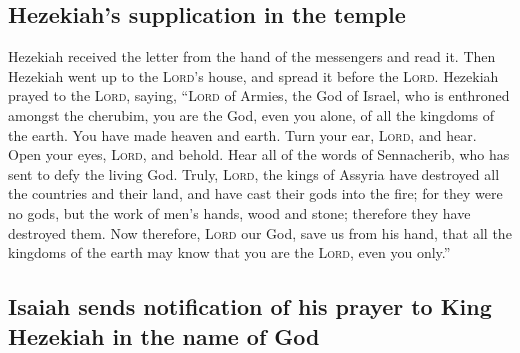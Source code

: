 \hypertarget{hezekiahs-supplication-in-the-temple}{%
\subsection{Hezekiah's supplication in the
temple}\label{hezekiahs-supplication-in-the-temple}}

 Hezekiah received the letter from the hand of the
messengers and read it. Then Hezekiah went up to the \textsc{Lord}'s
house, and spread it before the \textsc{Lord}.  Hezekiah
prayed to the \textsc{Lord}, saying,  ``\textsc{Lord} of
Armies, the God of Israel, who is enthroned amongst the cherubim, you
are the God, even you alone, of all the kingdoms of the earth. You have
made heaven and earth.  Turn your ear, \textsc{Lord}, and
hear. Open your eyes, \textsc{Lord}, and behold. Hear all of the words
of Sennacherib, who has sent to defy the living God. 
Truly, \textsc{Lord}, the kings of Assyria have destroyed all the
countries and their land,  and have cast their gods into
the fire; for they were no gods, but the work of men's hands, wood and
stone; therefore they have destroyed them.  Now
therefore, \textsc{Lord} our God, save us from his hand, that all the
kingdoms of the earth may know that you are the \textsc{Lord}, even you
only.''

\hypertarget{isaiah-sends-notification-of-his-prayer-to-king-hezekiah-in-the-name-of-god}{%
\subsection{Isaiah sends notification of his prayer to King Hezekiah in
the name of
God}\label{isaiah-sends-notification-of-his-prayer-to-king-hezekiah-in-the-name-of-god}}


